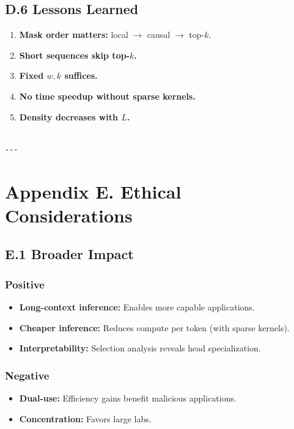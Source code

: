 \subsection{D.6 Lessons Learned}

\begin{enumerate}
\item \textbf{Mask order matters:} local $\to$ causal $\to$ top-$k$.
\item \textbf{Short sequences skip top-$k$.}
\item \textbf{Fixed $w, k$ suffices.}
\item \textbf{No time speedup without sparse kernels.}
\item \textbf{Density decreases with $L$.}
\end{enumerate}
\begin{lstlisting}

---
\end{lstlisting}


\section{Appendix E. Ethical Considerations}

\subsection{E.1 Broader Impact}

\subsubsection{Positive}
\begin{itemize}
\item \textbf{Long-context inference:} Enables more capable applications.
\item \textbf{Cheaper inference:} Reduces compute per token (with sparse kernels).
\item \textbf{Interpretability:} Selection analysis reveals head specialization.

\end{itemize}
\subsubsection{Negative}
\begin{itemize}
\item \textbf{Dual-use:} Efficiency gains benefit malicious applications.
\item \textbf{Concentration:} Favors large labs.

\end{itemize}
